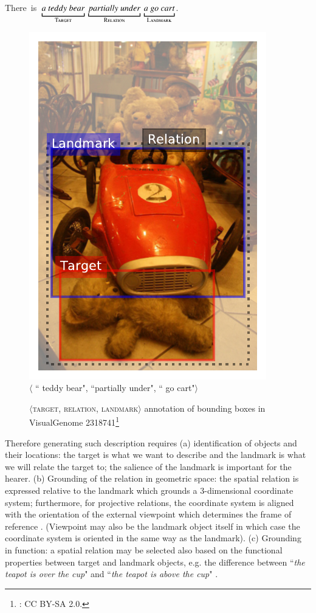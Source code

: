 \noindent There~is~$\underbracket{a~teddy~bear}_{\textsc{Target}}~\underbracket{partially~under}_{\textsc{Relation}}~\underbracket{a~go~cart}_{\textsc{Landmark}}$.
\begin{figure}[tb]
	\begin{minipage}{\columnwidth}
	\centering
	\includegraphics[width=0.4\columnwidth]{studies/inlg2019/figures/2318741.pdf}\\
	$\langle$ ``{\color{red} teddy bear}", ``partially under", ``{\color{blue} go cart}"$\rangle$
	\caption{$\langle$\textsc{target}, \textsc{relation}, \textsc{landmark}$\rangle$ annotation of bounding boxes in VisualGenome 2318741\protect\footnote{\citet{vg2318741}: CC BY-SA 2.0.} }
	\label{inlg2019:fig:data_example}
	\end{minipage}
\end{figure}

\noindent Therefore generating such description requires
(a) identification of objects and their locations:
the target is what we want to describe
and the landmark is what we will relate the target to;
the salience of the landmark is important for the hearer.
(b) Grounding of the relation in geometric space:
the spatial relation is expressed relative to the landmark which
grounds a 3-dimensional coordinate system; furthermore, for projective
relations, the coordinate system is aligned with the orientation of
the external viewpoint which determines the frame of
reference \cite{Maillat:2003}. (Viewpoint may also be the landmark object itself in which
case the coordinate system is oriented in the same way as the
landmark).
(c) Grounding in function:
a spatial relation may be selected also based on the functional
properties between target and landmark objects,
e.g. the difference between ``\textit{the teapot is over the
cup}" and ``\textit{the teapot is above the cup}" \cite{coventry2001interplay}.

